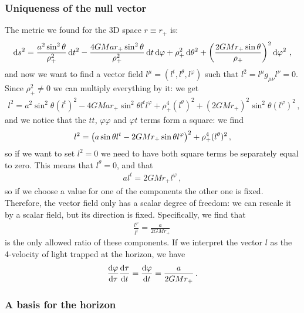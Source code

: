 \documentclass[main.tex]{subfiles}
\begin{document}
\subsubsection{Uniqueness of the null vector}

The metric we found for the 3D space \(r \equiv r_{+}\) is: 
%
\begin{align}
  \dd{s^2} = \frac{a^2 \sin^2\theta }{\rho_{+}^2} \dd{t^2} 
  - \frac{4GM a r_{+} \sin^2\theta }{\rho_{+}^2} \dd{t} \dd{\varphi } + \rho_{+}^2 \dd{\theta^2}
  + \qty(\frac{2GMr_{+} \sin \theta }{\rho_{+}})^2 \dd{\varphi^2}
\,,
\end{align}
%
and now we want to find a vector field \(l^{\mu } = (l^{t}, l^{\theta }, l^{\varphi })\) such that \(l^2 = l^{\mu } g_{\mu \nu } l^{\nu } = 0\). 
Since \(\rho_{+}^2 \neq 0\) we can multiply everything by it: we get 
%
\begin{align}
  l^2 = a^2 \sin^2\theta (l^{t})^2 
  - 4GMar_{+} \sin^2\theta l^{t} l^{\varphi }
  + \rho_{+}^{4} (l^{\theta })^2
  + (2GMr_{+})^2 \sin^2 \theta (l^{\varphi })^2
\,,
\end{align}
%
and we notice that the \(tt\), \(\varphi \varphi \) and \(\varphi t\) terms form a square: we find 
%
\begin{align}
  l^2= \qty(a \sin \theta l^{t} - 2GMr_{+} \sin \theta l^{\varphi })^2 + \rho_{+}^4 (l^{\theta })^2
\,,
\end{align}
%
so if we want to set \(l^2 = 0\) we need to have both square terms be separately equal to zero. 
This means that \(l^{\theta } = 0\), and that 
%
\begin{align}
  a l^{t} = 2GMr_{+} l^{\varphi }
\,,
\end{align}
%
so if we choose a value for one of the components the other one is fixed. Therefore, the vector field only has a scalar degree of freedom: we can rescale it by a scalar field, but its direction is fixed. Specifically, we find that 
%
\begin{align}
  \frac{l^{\varphi }}{l^{t}}  = \frac{a}{2GMr_{+}}
\,
\end{align}
%
is the only allowed ratio of these components. If we interpret the vector \(l\) as the 4-velocity of light trapped at the horizon, we have 
%
\begin{align}
    \dv{\varphi }{\tau } \dv{\tau }{t} = \dv{\varphi }{t}
    = \frac{a}{2GMr_{+}}
\,.
\end{align}

\subsubsection{A basis for the horizon}
\end{document}
